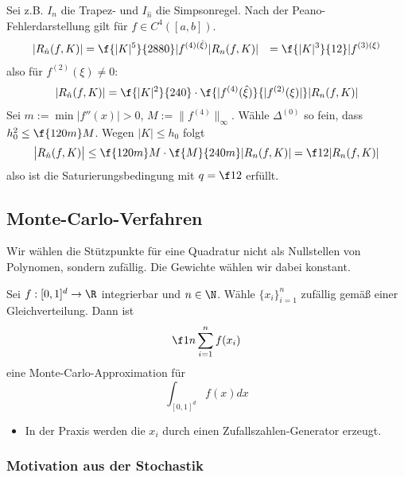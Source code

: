 \documentclass[11pt]{scrartcl}
\begin{document}
\begin{st}
\begin{note}
\begin{itemize}
				Sei z.B. $I_n$ die Trapez- und $I_{\hat n}$  die Simpsonregel.
				Nach der Peano-Fehlerdarstellung gilt für $f\in C^4([a,b])$.
				\begin{align*}
					|R_{\hat n}(f, K)| &= \f {|K|^5}{2880} |f^{(4)(\hat \xi)}
					|R_{n}(f, K)| &= \f {|K|^3}{12} |f^{(3)(\xi)}
				\end{align*}
				also für $f^{(2)}(\xi) \neq 0$:
				\begin{align*}
					|R_{\hat n}(f,K)| = \f {|K|^2}{240} \cdot \f {|f^{(4)}(\hat \xi)}{|f^{(2)}(\xi)|} |R_n(f,K)|
				\end{align*}
				Sei $m := \min |f''(x)| > 0$, $M := \|f^{(4)}\|_\infty$.
				Wähle $\Delta^{(0)}$ so fein, dass $h_0^2 \le \f {120 m}M$.
				Wegen $|K| \le h_0$ folgt
				\[
					\big| R_{\hat n}(f, K) \big| 
					\le \f {120m}M \cdot \f{M}{240m} |R_n(f,K)|
					= \f 12 |R_n(f,K)|
				\]
				also ist die Saturierungsbedingung mit $q=\f 12$ erfüllt.
		\end{itemize}
	\end{note}
\end{st}

\subsection{Monte-Carlo-Verfahren}

Wir wählen die Stützpunkte für eine Quadratur nicht als Nullstellen von Polynomen, sondern zufällig.
Die Gewichte wählen wir dabei konstant.

\begin{df}
	\label{2.38}	
	Sei $f:[0,1]^d \to \R$ integrierbar und $n\in \N$.
	Wähle $\{x_i\}_{i=1}^n$ zufällig gemäß einer Gleichverteilung.
	Dann ist
	\[
		\f 1n \sum_{i=1}^n f(x_i)
	\]
	eine Monte-Carlo-Approximation für
	\[
		\int_{[0,1]^d} f(x) dx
	\]
\end{df}

\begin{nt*}
	\begin{itemize}
		\item
			In der Praxis werden die $x_i$ durch einen Zufallszahlen-Generator erzeugt.
	\end{itemize}
\end{nt*}

\subsubsection{Motivation aus der Stochastik}
\end{document}
